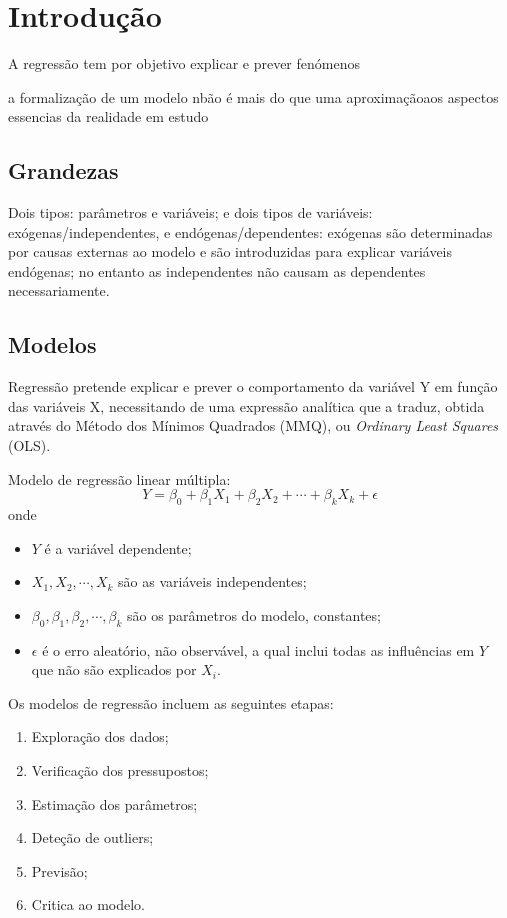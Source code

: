 \documentclass{assignment}
\begin{document}
\section*{Introdução}
A regressão tem por objetivo explicar e prever fenómenos

a formalização de um modelo nbão é mais do que uma aproximaçãoaos aspectos essencias da realidade em estudo

\subsection*{Grandezas}
Dois tipos: parâmetros e variáveis; e dois tipos de variáveis: exógenas/independentes, e endógenas/dependentes: exógenas são determinadas por causas externas ao modelo e são introduzidas para explicar variáveis endógenas; no entanto as independentes não causam as dependentes necessariamente.

\subsection*{Modelos}
Regressão pretende explicar e prever o comportamento da variável Y em função das variáveis X, necessitando de uma expressão analítica que a traduz, obtida através do Método dos Mínimos Quadrados (MMQ), ou \textit{Ordinary Least Squares} (OLS).


Modelo de regressão linear múltipla:
\begin{equation}
Y = \beta_0 + \beta_1 X_1 + \beta_2 X_2 + \cdots + \beta_k X_k + \epsilon
\end{equation}
onde
\begin{itemize}
  \item $Y$ é a variável dependente;
  \item $X_1, X_2, \cdots, X_k$ são as variáveis independentes;
  \item $\beta_0, \beta_1, \beta_2, \cdots, \beta_k$ são os parâmetros do  modelo, constantes;
  \item $\epsilon$ é o erro aleatório, não observável, a qual inclui todas as influências em $Y$ que não são explicados por $X_i$.
\end{itemize}
Os modelos de regressão incluem as seguintes etapas:
\begin{enumerate}
  \item Exploração dos dados;
  \item Verificação dos pressupostos;
  \item Estimação dos parâmetros;
  \item Deteção de outliers;
  \item Previsão;
  \item Critica ao modelo.
\end{enumerate}
\end{document}
